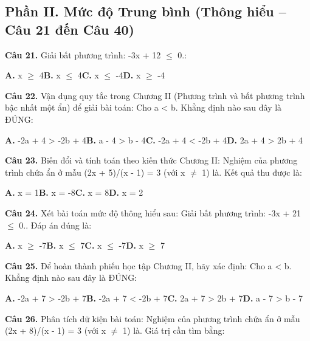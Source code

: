 \documentclass[11pt,a4paper]{article}
\begin{document}
\subsection*{\color{accent} Phần II. Mức độ Trung bình (Thông hiểu -- Câu 21 đến Câu 40)}
\textbf{\color{primary} Câu 21.} Giải bất phương trình: -3x + 12 $\le$ 0.:\par
\hspace*{1.5em}\textbf{A.} x $\ge$ 4\quad\quad \textbf{B.} x $\le$ 4\quad\quad \textbf{C.} x $\le$ -4\quad\quad \textbf{D.} x $\ge$ -4\par\vspace{2pt}
\textbf{\color{primary} Câu 22.} Vận dụng quy tắc trong Chương II (Phương trình và bất phương trình bậc nhất một ẩn) để giải bài toán: Cho a < b. Khẳng định nào sau đây là ĐÚNG:\par
\hspace*{1.5em}\textbf{A.} -2a + 4 > -2b + 4\quad\quad \textbf{B.} a - 4 > b - 4\quad\quad \textbf{C.} -2a + 4 < -2b + 4\quad\quad \textbf{D.} 2a + 4 > 2b + 4\par\vspace{2pt}
\textbf{\color{primary} Câu 23.} Biến đổi và tính toán theo kiến thức Chương II: Nghiệm của phương trình chứa ẩn ở mẫu (2x + 5)/(x - 1) = 3 (với x $\ne$ 1) là. Kết quả thu được là:\par
\hspace*{1.5em}\textbf{A.} x = 1\quad\quad \textbf{B.} x = -8\quad\quad \textbf{C.} x = 8\quad\quad \textbf{D.} x = 2\par\vspace{2pt}
\textbf{\color{primary} Câu 24.} Xét bài toán mức độ thông hiểu sau: Giải bất phương trình: -3x + 21 $\le$ 0.. Đáp án đúng là:\par
\hspace*{1.5em}\textbf{A.} x $\ge$ -7\quad\quad \textbf{B.} x $\le$ 7\quad\quad \textbf{C.} x $\le$ -7\quad\quad \textbf{D.} x $\ge$ 7\par\vspace{2pt}
\textbf{\color{primary} Câu 25.} Để hoàn thành phiếu học tập Chương II, hãy xác định: Cho a < b. Khẳng định nào sau đây là ĐÚNG:\par
\hspace*{1.5em}\textbf{A.} -2a + 7 > -2b + 7\quad\quad \textbf{B.} -2a + 7 < -2b + 7\quad\quad \textbf{C.} 2a + 7 > 2b + 7\quad\quad \textbf{D.} a - 7 > b - 7\par\vspace{2pt}
\textbf{\color{primary} Câu 26.} Phân tích dữ kiện bài toán: Nghiệm của phương trình chứa ẩn ở mẫu (2x + 8)/(x - 1) = 3 (với x $\ne$ 1) là. Giá trị cần tìm bằng:\par
\end{document}
